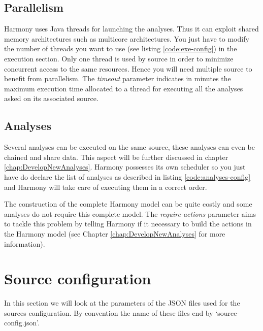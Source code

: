 		
		\subsection{Parallelism}
		Harmony uses Java threads for launching the analyses. Thus it can exploit shared memory architectures such as multicore architectures. You just have to modify the number of threads you want to use (see listing \ref{code:exe-config}) in the execution section. Only one thread is used by source in order to minimize concurrent access to the same resources. Hence you will need multiple source to benefit from parallelism. The \emph{timeout} parameter indicates in minutes the maximum execution time allocated to a thread for executing all the analyses asked on its associated source. 
		

		\subsection{Analyses}
		Several analyses can be executed on the same source, these analyses can even be chained and share data. This aspect will be further discussed in chapter \ref{chap:DevelopNewAnalyses}. Harmony possesses its own scheduler so you just have do declare the list of analyses as described in listing \ref{code:analyses-config} and Harmony will take care of executing them in a correct order.
		
		
		The construction of the complete Harmony model can be quite costly and some analyses do not require this complete model. The \emph{require-actions} parameter aims to tackle this problem by telling Harmony if it necessary to build the actions in the Harmony model (see Chapter \ref{chap:DevelopNewAnalyses} for more information).

	
	\section{Source configuration}\label{sec:advancedUse:sourceConfig}
In this section we will look at the parameters of the JSON files used for the sources configuration. By convention the name of these files end by `source-config.json'.
	
	